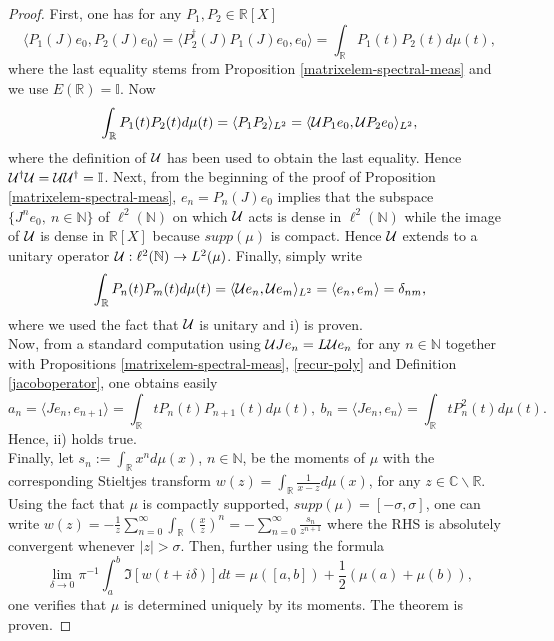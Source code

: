 \documentclass[a4paper,11pt,twoside]{article}
\numberwithin{equation}{section}
\newcommand\bbone{{ \mathbb{I}}}
\theoremstyle{nonumberplain}
\newtheorem{proof}{Proof}
\begin{document}
\begin{proof}
First, one has for any $P_1, P_2\in\mathbb{R}[X]$ 
\begin{equation}
\langle P_1(J)e_0, P_2(J)e_0\rangle=\langle P_2^\dag(J)P_1(J)e_0, e_0\rangle=\int_\mathbb{R}P_1(t)P_2(t)d\mu(t),
\end{equation}
where the last equality stems from Proposition \ref{matrixelem-spectral-meas} and we use $E(\mathbb{R})=\bbone$. Now 
\begin{equation}
\int_\mathbb{R}P_1(t)P_2(t)d\mu(t)=\langle P_1P_2\rangle_{L^2}= \langle {\cal{U}}P_1e_0,{\cal{U}}P_2e_0\rangle_{L^2},
\end{equation}
where the definition of ${\cal{U}}$ has been used to obtain the last equality. Hence ${\cal{U}}^\dag{\cal{U}}={\cal{U}}{\cal{U}}^\dag=\bbone$. Next, from the beginning of the proof of Proposition \ref{matrixelem-spectral-meas}, $e_n=P_n(J)e_0$ implies that the subspace $\{J^ne_0,\ n\in\mathbb{N}\}$ of $\ell^2(\mathbb{N})$ on which ${\cal{U}}$ acts is dense in $\ell^2(\mathbb{N})$ while the image of ${\cal{U}}$ is dense in $\mathbb{R}[X]$ because $supp(\mu)$ is compact. Hence ${\cal{U}}$ extends to a unitary operator ${\cal{U}}:\ell^2(\mathbb{N})\to L^2(\mu)$. Finally, simply write 
\begin{equation}
\int_\mathbb{R}P_n(t)P_m(t)d\mu(t)=\langle {\cal{U}}e_n,{\cal{U}}e_m\rangle_{L^2}=\langle e_n,e_m\rangle=\delta_{nm},
\end{equation}
where we used the fact that ${\cal{U}}$ is unitary and i) is proven. \\
Now, from a standard computation using ${\cal{U}}Je_n=L{\cal{U}}e_n$ for any $n\in\mathbb{N}$ together with Propositions \ref{matrixelem-spectral-meas}, \ref{recur-poly} and Definition \ref{jacoboperator}, one obtains easily 
\begin{equation}
a_n=\langle Je_n,e_{n+1} \rangle=\int_\mathbb{R}tP_n(t)P_{n+1}(t)d\mu(t),\ b_n=\langle Je_n,e_n\rangle=\int_\mathbb{R}tP_n^2(t)d\mu(t). 
\end{equation}
Hence, ii) holds true. \\
Finally, let $s_n:=\int_\mathbb{R}x^nd\mu(x)$, $n\in\mathbb{N}$, be the moments of $\mu$ with the corresponding Stieltjes transform $w(z)=\int_\mathbb{R}\frac{1}{x-z}d\mu(x)$, for any $z\in\mathbb{C}\backslash\mathbb{R}$. Using the fact that $\mu$ is compactly supported, $supp(\mu)=[-\sigma,\sigma]$, one can write $w(z)=-\frac{1}{z}\sum_{n=0}^\infty\int_\mathbb{R}(\frac{x}{z})^n=-\sum_{n=0}^\infty\frac{s_n}{z^{n+1}}$ where the RHS is absolutely convergent whenever $|z|>\sigma$. Then, further using the formula 
\begin{equation}
\lim_{\delta\to0}\pi^{-1}\int_a^b\Im[ w(t+i\delta)]dt=\mu([a,b])+\frac{1}{2}(\mu(a)+\mu(b)), 
\end{equation}
one verifies that $\mu$ is determined uniquely by its moments. The theorem is proven.
\end{proof}
\end{document}
